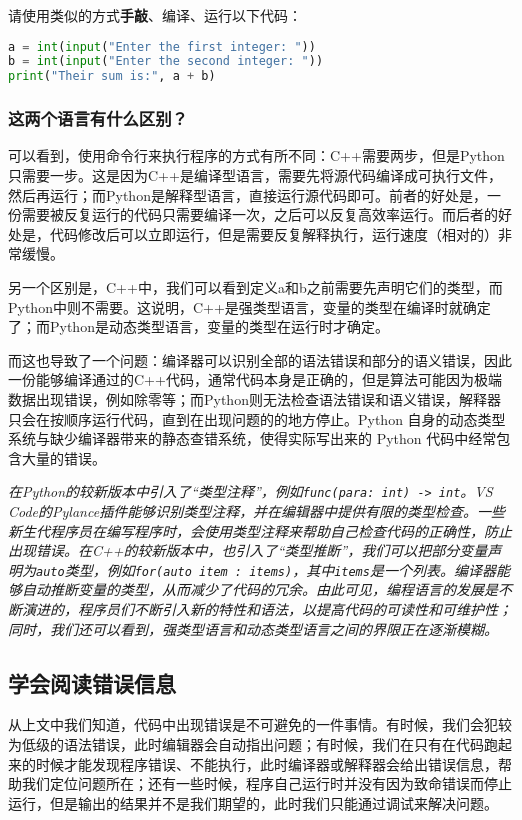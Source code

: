 \documentclass[../main.tex]{subfiles}
\begin{document}
请使用类似的方式\textbf{手敲}、编译、运行以下代码：

\begin{lstlisting}[language=Python]
a = int(input("Enter the first integer: "))
b = int(input("Enter the second integer: "))
print("Their sum is:", a + b)
\end{lstlisting}

\subsubsection{这两个语言有什么区别？}

可以看到，使用命令行来执行程序的方式有所不同：C++需要两步，但是Python只需要一步。这是因为C++是编译型语言，需要先将源代码编译成可执行文件，然后再运行；而Python是解释型语言，直接运行源代码即可。前者的好处是，一份需要被反复运行的代码只需要编译一次，之后可以反复高效率运行。而后者的好处是，代码修改后可以立即运行，但是需要反复解释执行，运行速度（相对的）非常缓慢。

另一个区别是，C++中，我们可以看到定义a和b之前需要先声明它们的类型，而Python中则不需要。这说明，C++是强类型语言，变量的类型在编译时就确定了；而Python是动态类型语言，变量的类型在运行时才确定。

而这也导致了一个问题：编译器可以识别全部的语法错误和部分的语义错误，因此一份能够编译通过的C++代码，通常代码本身是正确的，但是算法可能因为极端数据出现错误，例如除零等；而Python则无法检查语法错误和语义错误，解释器只会在按顺序运行代码，直到在出现问题的的地方停止。Python 自身的动态类型系统与缺少编译器带来的静态查错系统，使得实际写出来的 Python 代码中经常包含大量的错误。

\emph{在Python的较新版本中引入了“类型注释”，例如\texttt{func(para: int) -> int}。VS Code的Pylance插件能够识别类型注释，并在编辑器中提供有限的类型检查。一些新生代程序员在编写程序时，会使用类型注释来帮助自己检查代码的正确性，防止出现错误。在C++的较新版本中，也引入了“类型推断”，我们可以把部分变量声明为\texttt{auto}类型，例如\texttt{for(auto item : items)}，其中\texttt{items}是一个列表。编译器能够自动推断变量的类型，从而减少了代码的冗余。由此可见，编程语言的发展是不断演进的，程序员们不断引入新的特性和语法，以提高代码的可读性和可维护性；同时，我们还可以看到，强类型语言和动态类型语言之间的界限正在逐渐模糊。}

\subsection{学会阅读错误信息}

从上文中我们知道，代码中出现错误是不可避免的一件事情。有时候，我们会犯较为低级的语法错误，此时编辑器会自动指出问题；有时候，我们在只有在代码跑起来的时候才能发现程序错误、不能执行，此时编译器或解释器会给出错误信息，帮助我们定位问题所在；还有一些时候，程序自己运行时并没有因为致命错误而停止运行，但是输出的结果并不是我们期望的，此时我们只能通过调试来解决问题。
\end{document}
